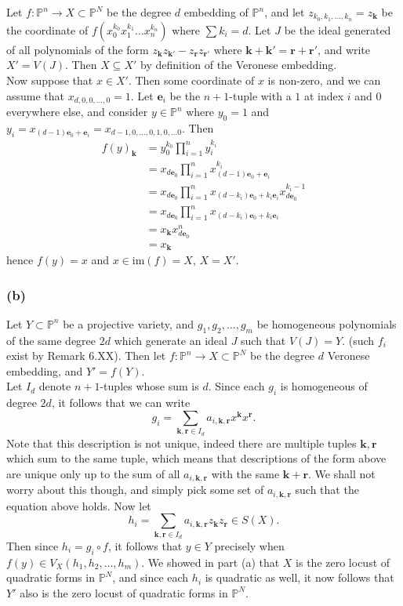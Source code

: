 \documentclass{article}
\theoremstyle{definition}
\renewcommand{\P}{\mathbb{P}}
\newcommand{\PP}[1]{\P^{#1}}
\newcommand{\im}{\text{im}}
\begin{document}
Let $f : \PP{n} \to X \subset \PP{N}$ be the degree $d$ embedding of $\PP{n}$,
and let $z_{k_0, k_1, \ldots, k_n} = z_{\bm{k}}$ be the coordinate of
$f(x_0^{k_0}x_1^{k_1} \ldots x_n^{k_n})$ where $\sum k_i = d$. Let $J$ be the
ideal generated of all polynomials of the form $z_{\bm{k}}z_{\bm{k}'} -
z_{\bm{r}}z_{\bm{r}'}$ where $\bm{k} + \bm{k}' = \bm{r} + \bm{r}'$, and write
$X' = V(J)$. Then $X \subseteq X'$ by definition of the Veronese embedding. \\ 


Now suppose that $x \in X'$. Then some coordinate of $x$ is non-zero, and we
can assume that $x_{d, 0, 0, \ldots, 0} = 1$. Let $\bm{e}_i$ be the $n +
1$-tuple with a $1$ at index $i$ and $0$ everywhere else, and consider $y \in
\PP{n}$ where $y_0 = 1$ and $y_i = x_{(d - 1)\bm{e}_0 + \bm{e}_i} = x_{d - 1,
0, \ldots, 0, 1, 0, \ldots 0}$. Then
\begin{align*}
	f(y)_{\bm{k}}
	&=
	y_0^{k_0}
	\prod_{i = 1}^{n}
	y_i^{k_i} \\
	&=
	x_{d \bm{e}_0}
	\prod_{i = 1}^{n}
	x_{(d - 1)\bm{e}_0 + \bm{e}_i}^{k_i} \\
	&=
	x_{d \bm{e}_0}
	\prod_{i = 1}^{n}
	x_{(d - k_i)\bm{e}_0 + k_i\bm{e}_i}
	x_{d\bm{e}_0}^{k_i - 1} \\
	&=
	x_{d \bm{e}_0}
	\prod_{i = 1}^{n}
	x_{(d - k_i)\bm{e}_0 + k_i\bm{e}_i} \\
	&=
	x_{\bm{k}}
	x_{d \bm{e}_0}^{n} \\
	&=
	x_{\bm{k}}
\end{align*}
hence $f(y) = x$ and $x \in \im(f) = X$, $X = X'$.

\subsubsection*{(b)}

Let $Y \subset \PP{n}$ be a projective variety, and $g_1, g_2, \ldots, g_m$ be
homogeneous polynomials of the same degree $2d$ which generate an ideal $J$
such that $V(J) = Y$. (such $f_i$ exist by Remark 6.XX). Then let $f : \PP{n} \to
X \subset \PP{N}$ be the degree $d$ Veronese embedding, and $Y' = f(Y)$. \\


Let $I_d$ denote $n + 1$-tuples whose sum is $d$. Since each $g_i$
is homogeneous of degree $2d$, it follows that we can write
\[
	g_i = \sum_{\bm{k}, \bm{r} \in I_d} a_{i, \bm{k}, \bm{r}} x^{\bm{k}}x^{\bm{r}}. 
\] 
Note that this description is not unique, indeed there are multiple tuples
$\bm{k}, \bm{r}$ which sum to the same tuple, which means that descriptions of
the form above are unique only up to the sum of all $a_{i, \bm{k}, \bm{r}}$ with
the same $\bm{k} + \bm{r}$. We shall not worry about this though, and simply
pick some set of $a_{i, \bm{k}, \bm{r}}$ such that the equation above holds. 
Now let
\[
	h_i = \sum_{\bm{k}, \bm{r} \in I_d} a_{i, \bm{k}, \bm{r}} z_{\bm{k}}z_{\bm{r}} \in S(X).
\]
Then since $h_i = g_i \circ f$, it follows that $y \in Y$ precisely when $f(y)
\in V_X(h_1, h_2, \ldots, h_m)$. We showed in part (a) that $X$ is the zero
locust of quadratic forms in $\PP{N}$, and since each $h_i$ is quadratic as
well, it now follows that $Y'$ also is the zero locust of quadratic forms in
$\PP{N}$.
\end{document}
